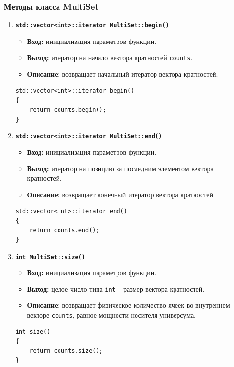 \documentclass[14pt, a4paper]{extarticle}
\begin{document}
	\subsubsection*{Методы класса MultiSet}
	\begin{enumerate}[label=\arabic*.]
		\item \textbf{\texttt{std::vector<int>::iterator MultiSet::begin()}}
		\begin{itemize}[leftmargin=*, noitemsep]
			\item \textbf{Вход:} инициализация параметров функции.
			\item \textbf{Выход:} итератор на начало вектора кратностей \texttt{counts}.
			\item \textbf{Описание:} возвращает начальный итератор вектора кратностей.
		\end{itemize}
		\begin{lstlisting}[caption={Метод MultiSet::begin()}, label={lst:multiset_begin}]
std::vector<int>::iterator begin()
{
    return counts.begin();
}
		\end{lstlisting}
		
		\item \textbf{\texttt{std::vector<int>::iterator MultiSet::end()}}
		\begin{itemize}[leftmargin=*, noitemsep]
			\item \textbf{Вход:} инициализация параметров функции.
			\item \textbf{Выход:} итератор на позицию за последним элементом вектора кратностей.
			\item \textbf{Описание:} возвращает конечный итератор вектора кратностей.
		\end{itemize}
		\begin{lstlisting}[caption={Метод MultiSet::end()}, label={lst:multiset_end}]
std::vector<int>::iterator end()
{
    return counts.end();
}
		\end{lstlisting}
		
		\item \textbf{\texttt{int MultiSet::size()}}
		\begin{itemize}[leftmargin=*, noitemsep]
			\item \textbf{Вход:} инициализация параметров функции.
			\item \textbf{Выход:} целое число типа \texttt{int} -- размер вектора кратностей.
			\item \textbf{Описание:} возвращает физическое количество ячеек во внутреннем векторе \texttt{counts}, равное мощности носителя универсума.
		\end{itemize}
		\begin{lstlisting}[caption={Метод MultiSet::size()}, label={lst:multiset_size}]
int size()
{
    return counts.size();
}
		\end{lstlisting}
		

\end{enumerate}
\end{document}
